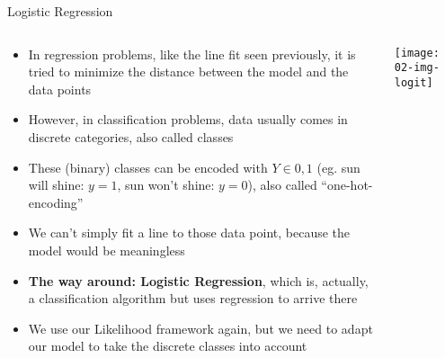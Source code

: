   \begin{frame}{Logistic Regression}
    \begin{columns}
      \begin{column}{0.65\textwidth}
        \begin{itemize}
          \item In regression problems, like the line fit seen previously, it is tried to minimize the distance between the model and the data points
          \item However, in classification problems, data usually comes in discrete categories, also called classes
          \item These (binary) classes can be encoded with $Y\in {0, 1}$ (eg. sun will shine: $y=1$, sun won't shine: $y=0$), also called \enquote{one-hot-encoding}
          \item We can't simply fit a line to those data point, because the model would be meaningless
          \item \textbf{The way around: Logistic Regression}, which is, actually, a classification algorithm but uses regression to arrive there
          \item We use our Likelihood framework again, but we need to adapt our model to take the discrete classes into account
        \end{itemize}
      \end{column}
      \begin{column}{0.35\textwidth}
        \vspace{1em}

        \texttt{[image: 02-img-logit]}
      \end{column}
    \end{columns}
  \end{frame}

